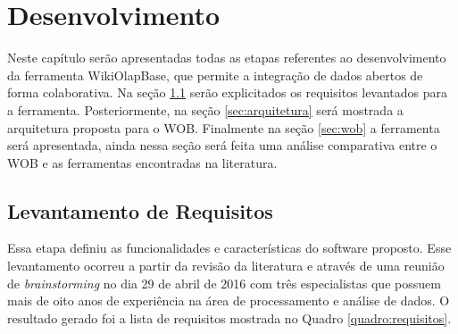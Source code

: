 \chapter{Desenvolvimento}
\label{chap:desenvolvimento}

Neste capítulo serão apresentadas todas as etapas referentes ao desenvolvimento da ferramenta
WikiOlapBase, que permite a integração de dados abertos de forma colaborativa. Na seção
\ref{sec:requisitos} serão explicitados os requisitos levantados para a ferramenta. 
Posteriormente, na seção \ref{sec:arquitetura} será mostrada a arquitetura proposta para o 
WOB. Finalmente na seção \ref{sec:wob} a ferramenta será apresentada, ainda nessa seção será 
feita uma análise comparativa entre o WOB e as ferramentas encontradas na literatura.

\section{Levantamento de Requisitos}
\label{sec:requisitos}

Essa etapa definiu as funcionalidades e características do software proposto. Esse 
levantamento ocorreu a partir da revisão da literatura e através de uma reunião de 
\textit{brainstorming} no dia 29 de abril de 2016 com três especialistas que possuem mais 
de oito anos de experiência na área de processamento e análise de dados. O resultado gerado 
foi a lista de requisitos mostrada no Quadro \ref{quadro:requisitos}.

